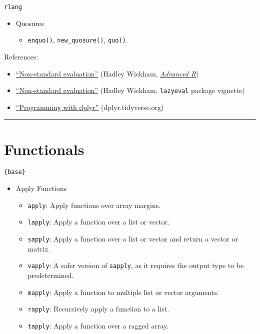 \documentclass[]{book}
\providecommand{\tightlist}{%
  \setlength{\itemsep}{0pt}\setlength{\parskip}{0pt}}
\begin{document}
\texttt{rlang}

\begin{itemize}
\tightlist
\item
  Quosures

  \begin{itemize}
  \tightlist
  \item
    \texttt{enquo()}, \texttt{new\_quosure()}, \texttt{quo()}.
  \end{itemize}
\end{itemize}

References:

\begin{itemize}
\tightlist
\item
  \href{http://adv-r.had.co.nz/Computing-on-the-language.html}{``Non-standard evaluation''} (Hadley Wickham, \href{http://adv-r.had.co.nz/}{\emph{Advanced R}})
\item
  \href{https://cran.r-project.org/web/packages/lazyeval/vignettes/lazyeval.html}{``Non-standard evaluation''} (Hadley Wickham, \texttt{lazyeval} package vignette)
\item
  \href{https://dplyr.tidyverse.org/articles/programming.html}{``Programming with dplyr''} (dplyr.tidyverse.org)
\end{itemize}

\begin{center}\rule{0.5\linewidth}{\linethickness}\end{center}

\hypertarget{functionals}{%
\section{Functionals}\label{functionals}}

\texttt{\{base\}}

\begin{itemize}
\tightlist
\item
  Apply Functions

  \begin{itemize}
  \tightlist
  \item
    \texttt{apply}: Apply functions over array margins.
  \item
    \texttt{lapply}: Apply a function over a list or vector.
  \item
    \texttt{sapply}: Apply a function over a list or vector and return a vector or matrix.
  \item
    \texttt{vapply}: A safer version of \texttt{sapply}, as it requires the output type to be predetermined.
  \item
    \texttt{mapply}: Apply a function to multiple list or vector arguments.
  \item
    \texttt{rapply}: Recursively apply a function to a list.
  \item
    \texttt{tapply}: Apply a function over a ragged array.
  \end{itemize}
\end{itemize}
\end{document}
